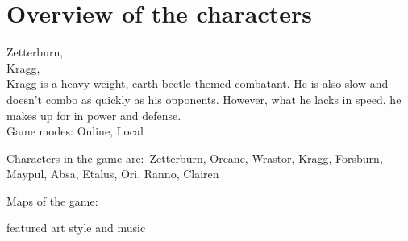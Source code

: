 \documentclass[11pt]{article}
\begin{document}
\chapter{Overview of the characters}
Zetterburn,\\
Kragg,\\
Kragg is a heavy weight, earth beetle themed combatant. He is also slow and doesn't combo as quickly as his opponents. However, what he lacks in speed, he makes up for in power and defense.\\



Game modes: Online, Local\ %


Characters in the game are:\
Zetterburn, Orcane, Wrastor, Kragg, Forsburn, Maypul, Absa, Etalus, Ori, Ranno, Clairen %

Maps of the game: \ %

featured art style and music\\ %

{}

\end{document}
